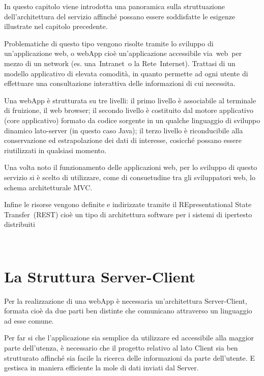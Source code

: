 In questo capitolo viene introdotta una panoramica sulla struttuazione dell’architettura del servizio affinché possano essere soddisfatte le esigenze illustrate nel capitolo precedente.

Problematiche di questo tipo vengono risolte tramite lo sviluppo di un’applicazione web, o webApp cioè un'applicazione accessibile via web per mezzo di un network (es. una Intranet o la Rete Internet). Trattasi di un modello applicativo di elevata comodità, in quanto permette ad ogni utente di effettuare una consultazione interattiva delle informazioni di cui necessita.

Una webApp è strutturata su tre livelli: il primo livello è associabile al terminale di fruizione, il web browser; il secondo livello è costituito dal motore applicativo (core applicativo)  formato da codice sorgente in un qualche linguaggio di sviluppo dinamico lato-server (in questo caso Java); il terzo livello è riconducibile alla conservazione ed estrapolazione dei dati di interesse, cosicché possano essere riutilizzati in qualsiasi momento.

Una volta noto il funzionamento delle applicazioni web, per lo sviluppo di questo servizio si è scelto di utilizzare, come di consuetudine tra gli sviluppatori web, lo schema architetturale MVC.

Infine le risorse vengono definite e indirizzate tramite il REpresentational State Transfer (REST) cioè un tipo di architettura software per i sistemi di ipertesto distribuiti

 \section{La Struttura Server-Client} %
\label{sec:la_struttura_server_client}



Per la realizzazione di una webApp è necessaria un’architettura Server-Client, formata cioè da due parti ben distinte che comunicano attraverso un linguaggio ad esse comune.

Per far si che l’applicazione sia semplice da utilizzare ed accessibile alla maggior parte dell’utenza, è necessario che il progetto relativo al lato Client sia ben strutturato affinché sia facile la ricerca delle informazioni da parte dell’utente. E gestisca in maniera efficiente la mole di dati inviati dal Server.


